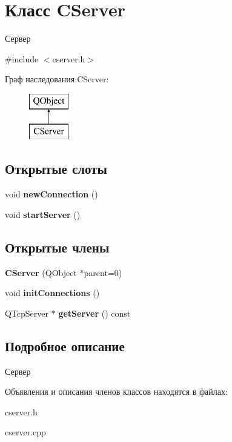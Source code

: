\hypertarget{class_c_server}{}\section{Класс C\+Server}
\label{class_c_server}


Сервер  




{\ttfamily \#include $<$cserver.\+h$>$}

Граф наследования\+:C\+Server\+:\begin{figure}[H]
\begin{center}
\leavevmode
\includegraphics[height=2.000000cm]{class_c_server}
\end{center}
\end{figure}
\subsection*{Открытые слоты}
\begin{DoxyCompactItemize}
\item 
\hypertarget{class_c_server_a4e5b127e1eb4342a130018d9ff921735}{}\label{class_c_server_a4e5b127e1eb4342a130018d9ff921735} 
void {\bfseries new\+Connection} ()
\item 
\hypertarget{class_c_server_adbc93cef317eac86a09a0b7067c96cc1}{}\label{class_c_server_adbc93cef317eac86a09a0b7067c96cc1} 
void {\bfseries start\+Server} ()
\end{DoxyCompactItemize}
\subsection*{Открытые члены}
\begin{DoxyCompactItemize}
\item 
\hypertarget{class_c_server_a743d64a8f7c949de3de873735f726fcf}{}\label{class_c_server_a743d64a8f7c949de3de873735f726fcf} 
{\bfseries C\+Server} (Q\+Object $\ast$parent=0)
\item 
\hypertarget{class_c_server_a32c8f33336a76b36c2653553b970e76c}{}\label{class_c_server_a32c8f33336a76b36c2653553b970e76c} 
void {\bfseries init\+Connections} ()
\item 
\hypertarget{class_c_server_a3ad6eca8c26fc7852aaf1c626c84e220}{}\label{class_c_server_a3ad6eca8c26fc7852aaf1c626c84e220} 
Q\+Tcp\+Server $\ast$ {\bfseries get\+Server} () const
\end{DoxyCompactItemize}


\subsection{Подробное описание}
Сервер 

Объявления и описания членов классов находятся в файлах\+:\begin{DoxyCompactItemize}
\item 
cserver.\+h\item 
cserver.\+cpp\end{DoxyCompactItemize}
